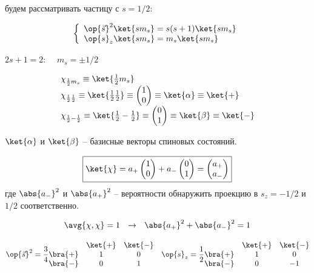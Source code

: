 будем рассматривать частицу с $s = 1/2$:

\begin{equation}
\label{eq:8_3_1}
\left\{
\begin{array}{l}
\op{\vec{s}}^2 \ket{s m_s} = s(s+1) \ket{s m_s}\\
\op{s}_z \ket{s m_s} = m_s \ket{s m_s}
\end{array}
\right.
\end{equation}

$2s + 1 = 2$:~~ $m_s = \pm 1/2$

\begin{equation}
\label{eq:8_3_2}
  \begin{array}{l}
  \chi_{\frac{1}{2} m_s} \equiv \ket{\frac{1}{2} m_s}\\
  \chi_{\frac{1}{2} \frac{1}{2}} \equiv \ket{\frac{1}{2} \frac{1}{2}} \equiv \begin{pmatrix} 1 \\ 0 \end{pmatrix}    \equiv \ket{\alpha} \equiv \ket{+}\\
  \chi_{\frac{1}{2} -\frac{1}{2}} \equiv \ket{\frac{1}{2} -\frac{1}{2}} \equiv \begin{pmatrix} 0 \\ 1 \end{pmatrix}   \equiv \ket{\beta} \equiv \ket{-}
\end{array}
\end{equation}

$\ket{\alpha}$ и $\ket{\beta}$ -- базисные векторы спиновых состояний.

\begin{equation}
\label{eq:8_3_3}
\boxed{
	\ket{\chi} = a_{+} \begin{pmatrix} 1 \\ 0 \end{pmatrix} + a_{-} \begin{pmatrix} 0 \\ 1 \end{pmatrix} = \begin{pmatrix} a_{+} \\ a_{-} \end{pmatrix}
}
\end{equation}
где $\abs{a_{-}}^2$ и $\abs{a_{+}}^2$ -- вероятности обнаружить проекцию в $s_z = -1/2$ и $1/2$ соответственно.

$$
\avg{\chi, \chi} = 1 ~~\rightarrow ~~ \abs{a_{+}}^2 + \abs{a_{-}}^2 = 1
$$

\begin{equation}
\label{eq:8_3_4}
\op{\vec{s}}^2 = \frac{3}{4}
\begin{matrix}
            & \ket{+} & \ket{-} \\
\bra{+} &  1         & 0         \\
\bra{-}  &  0         & 1         
\end{matrix}
~~~\op{s}_z = \frac{1}{2}
\begin{matrix}
            & \ket{+} & \ket{-} \\
\bra{+} &  1         & 0         \\
\bra{-}  &  0         & -1         
\end{matrix}
\end{equation}

